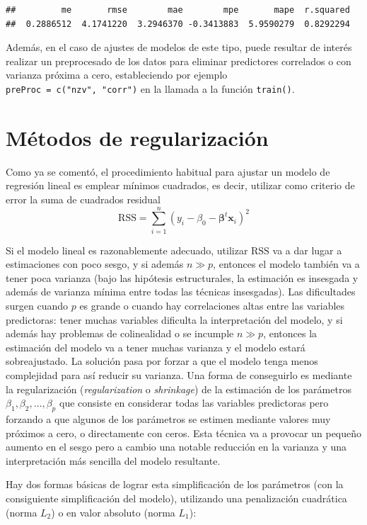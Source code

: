 \documentclass[
]{book}
\theoremstyle{break}
\theoremstyle{definition}
\theoremstyle{definition}
\theoremstyle{definition}
\theoremstyle{definition}
\theoremstyle{remark}
\begin{document}
\begin{verbatim}
##         me       rmse        mae        mpe       mape  r.squared 
##  0.2886512  4.1741220  3.2946370 -0.3413883  5.9590279  0.8292294
\end{verbatim}

Además, en el caso de ajustes de modelos de este tipo, puede resultar de interés realizar un preprocesado de los datos para eliminar predictores correlados o con varianza próxima a cero,
estableciendo por ejemplo \texttt{preProc\ =\ c("nzv",\ "corr")} en la llamada a la función \texttt{train()}.

\hypertarget{shrinkage}{%
\section{Métodos de regularización}\label{shrinkage}}

Como ya se comentó, el procedimiento habitual para ajustar un modelo de regresión lineal es emplear mínimos cuadrados, es decir, utilizar como criterio de error la suma de cuadrados residual
\[\mbox{RSS} = \sum\limits_{i=1}^{n}\left(  y_{i} - \beta_0 - \boldsymbol{\beta}^t \mathbf{x}_{i} \right)^{2}\]

Si el modelo lineal es razonablemente adecuado, utilizar \(\mbox{RSS}\) va a dar lugar a estimaciones con poco sesgo, y si además \(n\gg p\), entonces el modelo también va a tener poca varianza (bajo las hipótesis estructurales, la estimación es insesgada y además de varianza mínima entre todas las técnicas insesgadas).
Las dificultades surgen cuando \(p\) es grande o cuando hay correlaciones altas entre las variables predictoras: tener muchas variables dificulta la interpretación del modelo, y si además hay problemas de colinealidad o se incumple \(n\gg p\), entonces la estimación del modelo va a tener muchas varianza y el modelo estará sobreajustado.
La solución pasa por forzar a que el modelo tenga menos complejidad para así reducir su varianza.
Una forma de conseguirlo es mediante la regularización (\emph{regularization} o \emph{shrinkage}) de la estimación de los parámetros \(\beta_1, \beta_2,\ldots, \beta_p\) que consiste en considerar todas las variables predictoras pero forzando a que algunos de los parámetros se estimen mediante valores muy próximos a cero, o directamente con ceros.
Esta técnica va a provocar un pequeño aumento en el sesgo pero a cambio una notable reducción en la varianza y una interpretación más sencilla del modelo resultante.

Hay dos formas básicas de lograr esta simplificación de los parámetros (con la consiguiente simplificación del modelo), utilizando una penalización cuadrática (norma \(L_2\)) o en valor absoluto (norma \(L_1\)):
\end{document}
